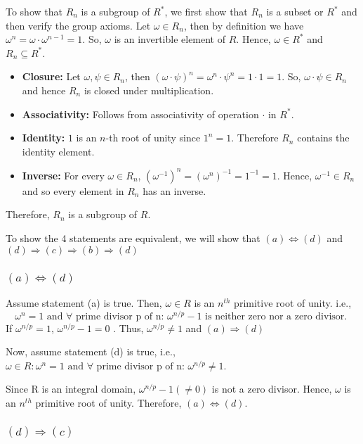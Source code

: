 To show that $R_n$ is a subgroup of $R^*$, we first show that $R_n$ is a subset or $R^*$ and then verify the group axioms. Let $\omega \in R_n$, then by definition we have $\omega^n = \omega \cdot \omega^{n-1} = 1$. So, $\omega$ is an invertible element of $R$. Hence, $\omega \in R^*$ and $R_n\subseteq R^*$.


\begin{itemize}
    \item \textbf{Closure: } Let $\omega, \psi \in R_n$, then $(\omega\cdot\psi)^n = \omega^n\cdot\psi^n = 1\cdot 1 = 1$. So, $\omega\cdot\psi \in R_n$ and hence $R_n$ is closed under multiplication. 

    \item \textbf{Associativity: } Follows from associativity of operation $\cdot$ in $R^*$.

    \item \textbf{Identity: } $1$ is an $n$-th root of unity since $1^n = 1$. Therefore $R_n$ contains the identity element.
    \item \textbf{Inverse: }  For every $\omega\in R_n$, $(\omega^{-1})^n = (\omega^n)^{-1}=1^{-1} = 1$. Hence, $\omega^{-1}\in R_n$ and so every element in $R_n$ has an inverse.
\end{itemize}

Therefore, $R_n$ is a subgroup of $R$.

To show the 4 statements are equivalent, we will show that $(a) \iff (d)$ and $(d) \Rightarrow (c) \Rightarrow (b) \Rightarrow (d)$
\subsubsection*{$(a) \iff (d)$}
Assume statement (a) is true. Then, $\omega \in R$ is an $n^{th}$ primitive root of unity. i.e., 
\[
\omega^n = 1 \text{ and } \forall \text{ prime divisor p of n: } \omega^{n/p} - 1 \text{ is neither zero nor a zero divisor. }
\]
If $ \omega^{n/p} = 1$, $\omega^{n/p}-1 = 0$ . Thus, $ \omega^{n/p} \ne 1$ and $(a) \Rightarrow (d)$

Now, assume statement (d) is true, i.e., $\omega \in R: \omega^n = 1 \text{ and } \forall \text{ prime divisor p of n: } \omega^{n/p} \ne 1 $.

Since R is an integral domain, $\omega^{n/p} - 1 (\ne 0)$ is not a zero divisor. Hence, $\omega$ is an $n^{th}$ primitive root of unity. Therefore, $(a) \iff (d)$.

\subsubsection*{$(d) \Rightarrow (c)$}

